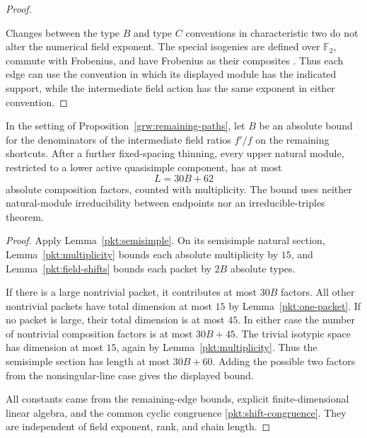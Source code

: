 \begin{proof}
\begin{enumerate}[label=\textup{(\alph*)}]
\end{enumerate}
Changes between the type $B$ and type $C$ conventions in
characteristic two do not alter the numerical field exponent.
The special isogenies are defined over $\mathbb F_2$, commute
with Frobenius, and have Frobenius as their composites
\cite[Section~I.3.1]{DowdSin1996}.  Thus each edge can use the
convention in which its displayed module has the indicated
support, while the intermediate field action has the same
exponent in either convention.
\end{proof}

\begin{theorem}
\label{pkt:bounded-length}
In the setting of Proposition~\ref{grw:remaining-paths}, let $B$ be
an absolute bound for the denominators of the intermediate
field ratios $f'/f$ on the remaining shortcuts.  After a
further fixed-spacing thinning, every upper natural module,
restricted to a lower active quasisimple component, has at most
\[
                              L=30B+62
\]
absolute composition factors, counted with multiplicity.
The bound uses neither natural-module irreducibility between
endpoints nor an irreducible-triples theorem.
\end{theorem}

\begin{proof}
Apply Lemma~\ref{pkt:semisimple}.  On its semisimple natural
section, Lemma~\ref{pkt:multiplicity} bounds each absolute
multiplicity by $15$, and Lemma~\ref{pkt:field-shifts} bounds
each packet by $2B$ absolute types.

If there is a large nontrivial packet, it contributes at most
$30B$ factors.  All other nontrivial packets have total
dimension at most $15$ by Lemma~\ref{pkt:one-packet}.
If no packet is large, their total dimension is at most $45$.
In either case the number of nontrivial composition factors
is at most $30B+45$.  The trivial isotypic space has dimension
at most $15$, again by Lemma~\ref{pkt:multiplicity}.  Thus the
semisimple section has length at most $30B+60$.  Adding the
possible two factors from the nonsingular-line case gives the
displayed bound.

All constants came from the remaining-edge bounds, explicit
finite-dimensional linear algebra, and the common cyclic
congruence \eqref{pkt:shift-congruence}.  They are independent
of field exponent, rank, and chain length.
\end{proof}
